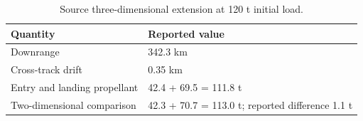 \begin{table}[htbp]
\caption{Source three-dimensional extension at 120 t initial load.}
\label{tab:src10}
\small
\setlength{\tabcolsep}{3.5pt}
\begin{tabularx}{\linewidth}{@{}p{.36\linewidth}X@{}}
\toprule
Quantity & Reported value \\
\midrule
Downrange & 342.3 km \\
Cross-track drift & 0.35 km \\
Entry and landing propellant & 42.4 + 69.5 = 111.8 t \\
Two-dimensional comparison & 42.3 + 70.7 = 113.0 t; reported difference 1.1 t \\
\bottomrule
\end{tabularx}
\par{}
\end{table}
